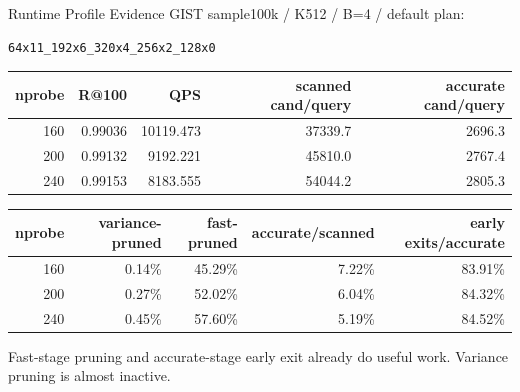 \documentclass[aspectratio=169,10pt]{beamer}
\begin{document}
\begin{frame}[fragile]{Runtime Profile Evidence}
\scriptsize
GIST sample100k / K512 / B=4 / default plan:
\begin{lstlisting}
64x11_192x6_320x4_256x2_128x0
\end{lstlisting}

\begin{tabular}{rrrrr}
\toprule
nprobe & R@100 & QPS & scanned cand/query & accurate cand/query \\
\midrule
160 & 0.99036 & 10119.473 & 37339.7 & 2696.3 \\
200 & 0.99132 & 9192.221 & 45810.0 & 2767.4 \\
240 & 0.99153 & 8183.555 & 54044.2 & 2805.3 \\
\bottomrule
\end{tabular}

\vspace{0.8em}
\begin{tabular}{rrrrr}
\toprule
nprobe & variance-pruned & fast-pruned & accurate/scanned & early exits/accurate \\
\midrule
160 & 0.14\% & 45.29\% & 7.22\% & 83.91\% \\
200 & 0.27\% & 52.02\% & 6.04\% & 84.32\% \\
240 & 0.45\% & 57.60\% & 5.19\% & 84.52\% \\
\bottomrule
\end{tabular}

\vspace{0.8em}
\small
Fast-stage pruning and accurate-stage early exit already do useful work.
Variance pruning is almost inactive.
\end{frame}
\end{document}
